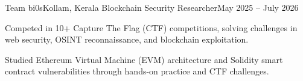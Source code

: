 \resumeSubheading
  {Team bi0s}{Kollam, Kerala}
  {Blockchain Security Researcher}{May 2025 -- July 2026}
  \resumeItemListStart
    \item Competed in 10+ Capture The Flag (CTF) competitions, solving challenges in web security, OSINT reconnaissance, and blockchain exploitation.
    \item Studied Ethereum Virtual Machine (EVM) architecture and Solidity smart contract vulnerabilities through hands-on practice and CTF challenges.
  \resumeItemListEnd

